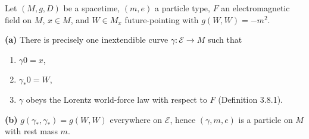 Let $(M, g, D)$ be a spacetime, $(m, e)$ a particle type, $F$ an electromagnetic field on $M$, $x \in M$, and $W \in M_x$ future-pointing with $g(W, W) = -m^2$.

\textbf{(a)} There is precisely one inextendible curve $\gamma: \mathcal{E} \rightarrow M$ such that
\begin{enumerate}
  \item $\gamma 0 = x$,
  \item $\gamma_* 0 = W$,
  \item $\gamma$ obeys the Lorentz world-force law with respect to $F$ (Definition 3.8.1).
\end{enumerate}

\textbf{(b)} $g(\gamma_*, \gamma_*) = g(W, W)$ everywhere on $\mathcal{E}$, hence $(\gamma, m, e)$ is a particle on $M$ with rest mass $m$.
